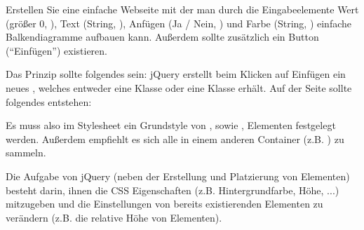 %
\par Erstellen Sie eine einfache Webseite mit der man durch die Eingabeelemente
Wert (größer $0$, ), Text (String, ), Anfügen (Ja /
Nein, ) und Farbe (String, ) einfache
Balkendiagramme aufbauen kann. Außerdem sollte zusätzlich ein Button
(``Einfügen'') existieren.
%

%
\par Das Prinzip sollte folgendes sein: jQuery erstellt beim Klicken auf
Einfügen ein neues , welches entweder eine Klasse  oder
eine Klasse  erhält. Auf der Seite sollte folgendes entstehen:

\par Es muss also im Stylesheet ein Grundstyle von , sowie
, Elementen festgelegt werden. Außerdem empfiehlt es sich alle
 in einem anderen Container (z.B. ) zu
sammeln.
%
\par Die Aufgabe von jQuery (neben der Erstellung und Platzierung von
Elementen) besteht darin, ihnen die CSS Eigenschaften (z.B. Hintergrundfarbe,
Höhe, ...) mitzugeben und die Einstellungen von bereits existierenden Elementen
zu verändern (z.B. die relative Höhe von  Elementen).